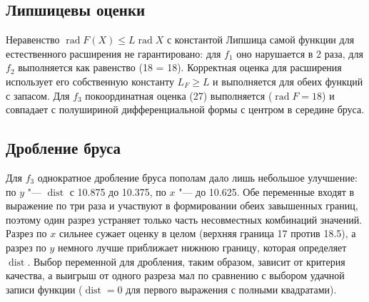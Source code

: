 \documentclass[12pt,a4paper]{article}
\newcommand{\rad}{\operatorname{rad}}
\newcommand{\dist}{\operatorname{dist}}
\begin{document}
\subsection*{Липшицевы оценки}
Неравенство $\rad F(X)\le L\rad X$ с константой Липшица самой функции для естественного расширения не гарантировано: для $f_1$ оно нарушается в 2 раза, для $f_2$ выполняется как равенство (18 = 18). Корректная оценка для расширения использует его собственную константу $L_F\ge L$ и выполняется для обеих функций с запасом. Для $f_3$ покоординатная оценка (27) выполняется ($\rad F=18$) и совпадает с полушириной дифференциальной формы с центром в середине бруса.

\subsection*{Дробление бруса}
Для $f_3$ однократное дробление бруса пополам дало лишь небольшое улучшение: по $y$ "--- $\dist$ с 10.875 до 10.375, по $x$ "--- до 10.625. Обе переменные входят в выражение по три раза и участвуют в формировании обеих завышенных границ, поэтому один разрез устраняет только часть несовместных комбинаций значений. Разрез по $x$ сильнее сужает оценку в целом (верхняя граница 17 против 18.5), а разрез по $y$ немного лучше приближает нижнюю границу, которая определяет $\dist$. Выбор переменной для дробления, таким образом, зависит от критерия качества, а выигрыш от одного разреза мал по сравнению с выбором удачной записи функции ($\dist=0$ для первого выражения с полными квадратами).

\end{document}
